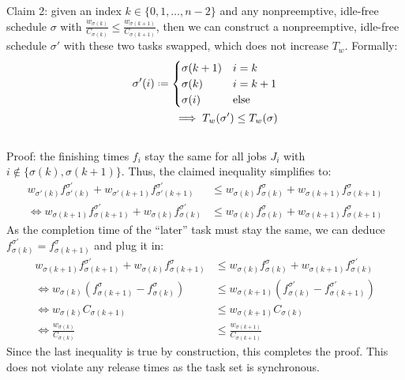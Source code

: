 \documentclass[a4paper,parskip,headheight=38pt]{scrartcl} %
\newcommand{\defeq}{\mathrel{\vcenter{\baselineskip0.5ex \lineskiplimit0pt
                    \hbox{\scriptsize.}\hbox{\scriptsize.}}}%
                    =}
\begin{document}
Claim 2: given an index $k \in \{0, 1, \ldots, n - 2\}$ and any
nonpreemptive, idle-free schedule $\sigma$ with
$\frac{w_{\sigma(k)}}{C_{\sigma(k)}} \leq \frac{w_{\sigma(k +
1)}}{C_{\sigma(k+1)}}$, then we can construct a nonpreemptive,
idle-free schedule $\sigma'$ with these two tasks swapped, which
does not increase $T_w$.  Formally:
\begin{align}
    \sigma'(i) \defeq \begin{cases}
        \sigma(k + 1) & i = k \\
        \sigma(k) & i = k + 1 \\
        \sigma(i) & \text{else}
    \end{cases} \\
    \implies T_w(\sigma') \leq T_w(\sigma)
\end{align}
 \\
Proof: the finishing times $f_i$ stay the same for all jobs
$J_i$ with $i \notin \{\sigma(k), \sigma(k+1)\}$.  Thus, the claimed
inequality simplifies to:
\begin{align}
    w_{\sigma'(k)}f_{\sigma'(k)}^{\sigma'} + w_{\sigma'(k + 1)}f_{\sigma'(k + 1)}^{\sigma'}
    &\leq w_{\sigma(k)}f_{\sigma(k)}^{\sigma} + w_{\sigma(k + 1)}f_{\sigma(k + 1)}^{\sigma}
        \\ \iff
    w_{\sigma(k+1)}f_{\sigma(k+1)}^{\sigma'} + w_{\sigma(k)}f_{\sigma(k)}^{\sigma'}
    &\leq w_{\sigma(k)}f_{\sigma(k)}^{\sigma} + w_{\sigma(k + 1)}f_{\sigma(k + 1)}^{\sigma}
\end{align}
As the completion time of the \enquote{later} task must stay the same,
we can deduce $f_{\sigma(k)}^{\sigma'} = f_{\sigma(k+1)}^{\sigma}$ and
plug it in:
\begin{align}
    w_{\sigma(k+1)}f_{\sigma(k+1)}^{\sigma'} + w_{\sigma(k)}f_{\sigma(k+1)}^{\sigma}
    &\leq w_{\sigma(k)}f_{\sigma(k)}^{\sigma} + w_{\sigma(k + 1)}f_{\sigma(k)}^{\sigma'}
        \\ \iff
    w_{\sigma(k)}(f_{\sigma(k+1)}^{\sigma} - f_{\sigma(k)}^{\sigma})
    &\leq w_{\sigma(k+1)}(f_{\sigma(k)}^{\sigma'} - f_{\sigma(k+1)}^{\sigma'})
        \\ \iff
    w_{\sigma(k)}C_{\sigma(k+1)}
    &\leq w_{\sigma(k+1)}C_{\sigma(k)}
        \\ \iff
    \frac{w_{\sigma(k)}}{C_{\sigma(k)}}
    &\leq \frac{w_{\sigma(k + 1)}}{C_{\sigma(k+1)}}
\end{align}
Since the last inequality is true by construction, this completes the
proof.  This does not violate any release times as the task set is
synchronous.
\end{document}
